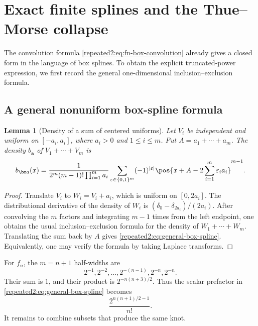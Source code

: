 \documentclass[11pt,oneside]{article}
\newtheorem{lemma}[theorem]{Lemma}
\theoremstyle{definition}
\theoremstyle{remark}
\begin{document}
\section{Exact finite splines and the Thue--Morse collapse}
\label{repeated2:sec:exact-spline}

The convolution formula \eqref{repeated2:eq:fn-box-convolution} already gives a closed form in the
language of box splines.  To obtain the explicit truncated-power expression, we first
record the general one-dimensional inclusion--exclusion formula.

\subsection{A general nonuniform box-spline formula}

\begin{lemma}[Density of a sum of centered uniforms]
\label{repeated2:lem:general-box-spline}
Let $V_i$ be independent and uniform on $[-a_i,a_i]$, where $a_i>0$ and
$1\le i\le m$.  Put $A=a_1+\cdots+a_m$.  The density $b_{\bm a}$ of
$V_1+\cdots+V_m$ is
\begin{equation}
 b_{\bm a}(x)=
 \frac{1}{2^m(m-1)!\prod_{i=1}^{m}a_i}
 \sum_{\varepsilon\in\{0,1\}^m}(-1)^{|\varepsilon|}
 \pos{x+A-2\sum_{i=1}^{m}\varepsilon_i a_i}^{m-1}.
 \label{repeated2:eq:general-box-spline}
\end{equation}
\end{lemma}

\begin{proof}
Translate $V_i$ to $W_i=V_i+a_i$, which is uniform on $[0,2a_i]$.  The distributional
derivative of the density of $W_i$ is
$(\delta_0-\delta_{2a_i})/(2a_i)$.  After convolving the $m$ factors and integrating
$m-1$ times from the left endpoint, one obtains the usual inclusion--exclusion formula
for the density of $W_1+\cdots+W_m$.  Translating the sum back by $A$ gives
\eqref{repeated2:eq:general-box-spline}.  Equivalently, one may verify the formula by taking
Laplace transforms.
\end{proof}

For $f_n$, the $m=n+1$ half-widths are
\begin{equation}
 2^{-1},2^{-2},\ldots,2^{-(n-1)},2^{-n},2^{-n}.
 \label{repeated2:eq:fn-halfwidths}
\end{equation}
Their sum is $1$, and their product is $2^{-n(n+3)/2}$.  Thus the scalar prefactor in
\eqref{repeated2:eq:general-box-spline} becomes
\begin{equation}
 \frac{2^{n(n+1)/2-1}}{n!}.
 \label{repeated2:eq:box-prefactor}
\end{equation}
It remains to combine subsets that produce the same knot.
\end{document}
